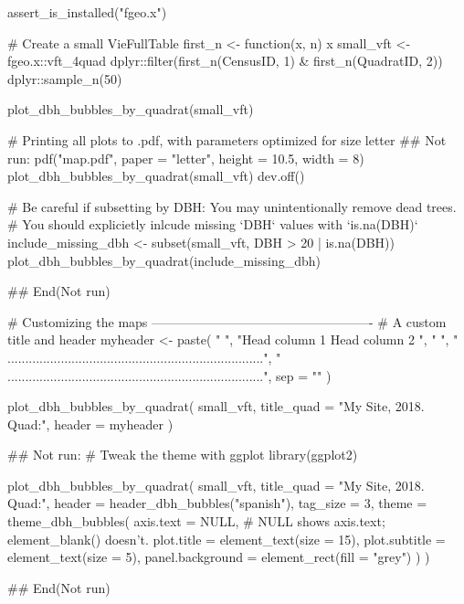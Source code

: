 \documentclass[a4paper]{book}
\begin{document}
\begin{Examples}
\begin{ExampleCode}
assert_is_installed("fgeo.x")

# Create a small VieFullTable
first_n <- function(x, n) x %
small_vft <- fgeo.x::vft_4quad %
  dplyr::filter(first_n(CensusID, 1) & first_n(QuadratID, 2)) %
  dplyr::sample_n(50)

plot_dbh_bubbles_by_quadrat(small_vft)

# Printing all plots to .pdf, with parameters optimized for size letter
## Not run: 
pdf("map.pdf", paper = "letter", height = 10.5, width = 8)
plot_dbh_bubbles_by_quadrat(small_vft)
dev.off()

# Be careful if subsetting by DBH: You may unintentionally remove dead trees.
# You should explicietly inlcude missing `DBH` values with `is.na(DBH)`
include_missing_dbh <- subset(small_vft, DBH > 20 | is.na(DBH))
plot_dbh_bubbles_by_quadrat(include_missing_dbh)

## End(Not run)

# Customizing the maps ----------------------------------------------------
# A custom title and header
myheader <- paste(
  " ",
  "Head column 1                     Head column 2                          ",
  " ",
  " ........................................................................",
  " ........................................................................",
  sep = "\n"
)

plot_dbh_bubbles_by_quadrat(
  small_vft,
  title_quad = "My Site, 2018. Quad:",
  header = myheader
)

## Not run: 
# Tweak the theme with ggplot
library(ggplot2)

plot_dbh_bubbles_by_quadrat(
  small_vft,
  title_quad = "My Site, 2018. Quad:",
  header = header_dbh_bubbles("spanish"),
  tag_size = 3,
  theme = theme_dbh_bubbles(
    axis.text = NULL, # NULL shows axis.text; element_blank() doesn't.
    plot.title = element_text(size = 15),
    plot.subtitle = element_text(size = 5),
    panel.background = element_rect(fill = "grey")
  )
)

## End(Not run)
\end{ExampleCode}
\end{Examples}
%
\end{document}
